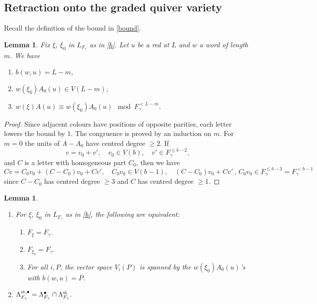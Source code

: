 \documentclass[11pt,reqno]{amsart}
\newtheorem{Lemma}[Theorem]{Lemma}
\theoremstyle{definition}
\theoremstyle{remark}
\begin{document}
\subsection{Retraction onto the graded quiver variety}\label{subsec:retraction}
Recall the definition of the bound in \eqref{bound}.

\begin{Lemma}\label{lem:leading}
Fix $\xi$, $\xi_0$ in $L_{F_\gamma}$ as in \eqref{h}.
Let $u$ be a red at $L$ and $w$ a word of length $m$. We have 
\begin{enumerate}[label=$\mathrm{(\alph*)}$,leftmargin=8mm,itemsep=1mm]
\item 
$b(w,u)=L-m$,
\item
$w(\xi_0)A_0(u)\in V(L-m)$,
\item
$w(\xi)A(u)\equiv w(\xi_0)A_0(u)\mod{F_\gamma^{<L-m}}.$
\end{enumerate}
\end{Lemma}

\begin{proof}
Since adjacent colours have positions of opposite parities, each letter lowers the bound by  $1$. 
The congruence is proved by an induction on $m$. 
For $m=0$ the units of $A-A_0$ have centred degree $\geqslant2$. 
If 
$$v=v_0+v',\quad
v_0\in V(b),\quad
v'\in F_\gamma^{\leqslant b-2},$$ and $C$ is a
letter with homogeneous part $C_0$, then we have
$$Cv=C_0v_0+(C-C_0)v_0+Cv',\quad C_0v_0\in V(b-1),\quad
(C-C_0)v_0+Cv'\,,\, C_0v_0\in F_\gamma^{\leqslant b-3}=F_\gamma^{<b-1}$$ 
since $C-C_0$ has centred degree $\geqslant3$ and $C$ has centred degree $\geqslant1$.
\end{proof}

\begin{Lemma}\label{lem:stab}\hfill
\begin{enumerate}[label=$\mathrm{(\alph*)}$,leftmargin=8mm,itemsep=1mm]
\item 
For $\xi$, $\xi_0$ in $L_{F_\gamma}$ as in \eqref{h},
the following are equivalent: 
\begin{enumerate}[label=$\mathrm{(\arabic*)}$, leftmargin=8mm,itemsep=1mm]
\item 
$F_\xi=F_\gamma$.
\item
 $F_{\xi_0}=F_\gamma$.
\item
For all $i,P$, the vector space $V_i(P)$ is spanned by the $w(\xi_0)A_0(u)$'s with $b(w,u)=P$. 
\end{enumerate}
\item
$\Lambda_{F_\gamma}^{\rm st,\bullet}
=\Lambda_{F_\gamma}^\bullet\cap
\Lambda^{\rm st}_{F_\gamma}.$
\end{enumerate}
\end{Lemma}
\end{document}
